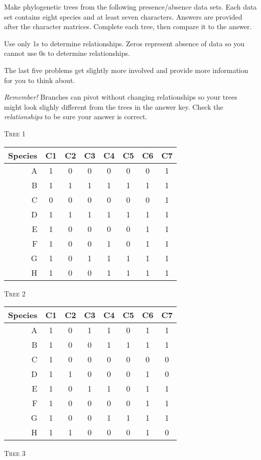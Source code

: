 \documentclass[12pt]{article}
\begin{document}
\thispagestyle{plain}

Make phylogenetic trees from the following presence/absence data 
sets. Each data set contains eight species and at least seven 
characters. Answers are provided after the character matrices.
Complete each tree, then compare it to the answer. 

Use only 1s to determine relationships. Zeros represent absence 
of data so you cannot use 0s to determine relationships. 

The last five problems get slightly more involved and provide more
information for you to think about.

\emph{Remember!} Branches can pivot without changing relationships 
so your trees might look slighly different from the trees in the 
answer key. Check the \emph{relationships} to be sure your answer is 
correct.

\bigskip

\textsc{Tree 1}

\begin{longtable}[l]{@{}rccccccc@{}}
\toprule
Species	& C1	& C2	& C3	& C4	& C5	& C6	& C7 \tabularnewline
\midrule
A 		& 1 	& 0 	& 0 	& 0		& 0 	& 0 	& 1  \tabularnewline
B 		& 1 	& 1 	& 1 	& 1		& 1 	& 1 	& 1  \tabularnewline
C 		& 0 	& 0 	& 0 	& 0 	& 0 	& 0 	& 1  \tabularnewline
D 		& 1 	& 1 	& 1 	& 1 	& 1 	& 1 	& 1  \tabularnewline
E 		& 1 	& 0 	& 0 	& 0 	& 0 	& 1 	& 1  \tabularnewline
F 		& 1 	& 0 	& 0 	& 1 	& 0 	& 1 	& 1  \tabularnewline
G 		& 1 	& 0 	& 1 	& 1 	& 1 	& 1 	& 1  \tabularnewline
H 		& 1 	& 0 	& 0 	& 1 	& 1 	& 1 	& 1  \tabularnewline
\bottomrule
\end{longtable}

\quad

\textsc{Tree 2}

\begin{longtable}[l]{@{}rccccccc@{}}
\toprule
Species	& C1	& C2	& C3	& C4	& C5	& C6	& C7 \tabularnewline
\midrule
A 		& 1 	& 0 	& 1 	& 1		& 0 	& 1 	& 1  \tabularnewline
B 		& 1 	& 0 	& 0 	& 1 	& 1 	& 1 	& 1  \tabularnewline
C 		& 1 	& 0 	& 0 	& 0 	& 0 	& 0 	& 0  \tabularnewline
D 		& 1 	& 1 	& 0 	& 0 	& 0 	& 1 	& 0  \tabularnewline
E 		& 1 	& 0 	& 1 	& 1 	& 0 	& 1 	& 1  \tabularnewline
F 		& 1 	& 0 	& 0 	& 0 	& 0 	& 1 	& 1  \tabularnewline
G 		& 1 	& 0 	& 0 	& 1 	& 1 	& 1 	& 1  \tabularnewline
H 		& 1 	& 1 	& 0 	& 0 	& 0 	& 1 	& 0  \tabularnewline
\bottomrule
\end{longtable}

\newpage

\textsc{Tree 3}
\end{document}
